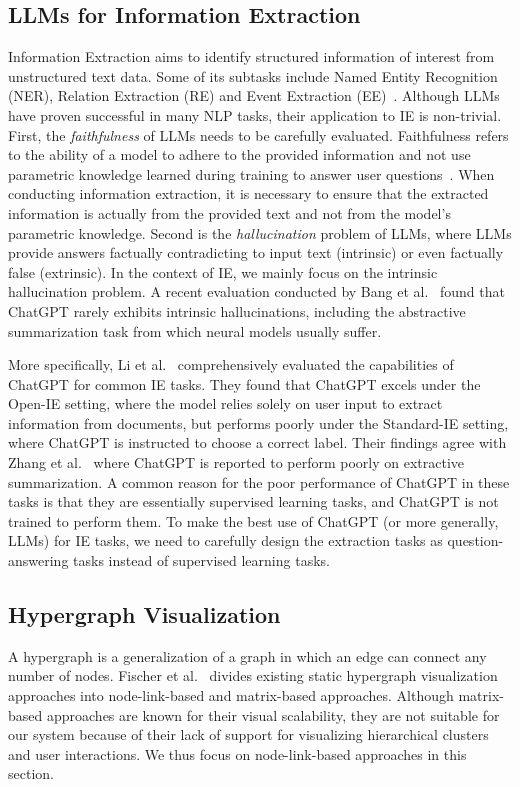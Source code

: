 \subsection{LLMs for Information Extraction}
Information Extraction aims to identify structured information of interest from unstructured text data.
Some of its subtasks include Named Entity Recognition (NER), Relation Extraction (RE) and Event Extraction (EE)~\cite{nasar2021named, xiang2019surveyee}.
Although LLMs have proven successful in many NLP tasks, their application to IE is non-trivial.
First, the \textit{faithfulness} of LLMs needs to be carefully evaluated.
Faithfulness refers to the ability of a model to adhere to the provided information and not use parametric knowledge learned during training to answer user questions~\cite{zhou2023contextfaithful}.
When conducting information extraction, it is necessary to ensure that the extracted information is actually from the provided text and not from the model's parametric knowledge.
Second is the \textit{hallucination} problem of LLMs, where LLMs provide answers factually contradicting to input text (intrinsic) or even factually false (extrinsic). 
In the context of IE, we mainly focus on the intrinsic hallucination problem.
A recent evaluation conducted by Bang et al.~\cite{bang2023multitask} found that ChatGPT rarely exhibits intrinsic hallucinations, including the abstractive summarization task from which neural models usually suffer.

More specifically, Li et al.~\cite{li2023evaluateChatgpt} comprehensively evaluated the capabilities of ChatGPT for common IE tasks.
They found that ChatGPT excels under the Open-IE setting, where the model relies solely on user input to extract information from documents, but performs poorly under the Standard-IE setting, where ChatGPT is instructed to choose a correct label.
Their findings agree with Zhang et al.~\cite{zhang2023extractive} where ChatGPT is reported to perform poorly on extractive summarization.
A common reason for the poor performance of ChatGPT in these tasks is that they are essentially supervised learning tasks, and ChatGPT is not trained to perform them.
To make the best use of ChatGPT (or more generally, LLMs) for IE tasks, we need to carefully design the extraction tasks as question-answering tasks instead of supervised learning tasks.

\subsection{Hypergraph Visualization}
A hypergraph is a generalization of a graph in which an edge can connect any number of nodes.
Fischer et al.~\cite{fischer2021hypergraphsurvey} divides existing static hypergraph visualization approaches into node-link-based and matrix-based approaches.
Although matrix-based approaches are known for their visual scalability, they are not suitable for our system because of their lack of support for visualizing hierarchical clusters and user interactions.
We thus focus on node-link-based approaches in this section.

